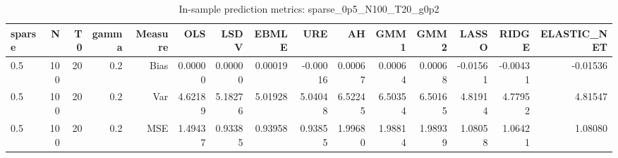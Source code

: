 \begin{table}[!htbp]\centering
\caption{In-sample prediction metrics: sparse_0p5_N100_T20_g0p2}
\label{tab:table2_sparse_0p5_N100_T20_g0p2}
\begin{tabular}{lrrrrrrrrrrrrrr}
\hline
sparse & N & T0 & gamma & Measure & OLS & LSDV & EBMLE & URE & AH & GMM1 & GMM2 & LASSO & RIDGE & ELASTIC_NET \\
\hline
0.5 & 100 & 20 & 0.2 & Bias & 0.00000 & 0.00000 & 0.00019 & -0.00016 & 0.00067 & 0.00064 & 0.00068 & -0.01561 & -0.00431 & -0.01536 \\
0.5 & 100 & 20 & 0.2 & Var & 4.62189 & 5.18276 & 5.01928 & 5.04048 & 6.52245 & 6.50354 & 6.50165 & 4.81914 & 4.77952 & 4.81547 \\
0.5 & 100 & 20 & 0.2 & MSE & 1.49437 & 0.93385 & 0.93958 & 0.93855 & 1.99680 & 1.98814 & 1.98939 & 1.08058 & 1.06421 & 1.08080 \\
\hline
\end{tabular}
\end{table}

